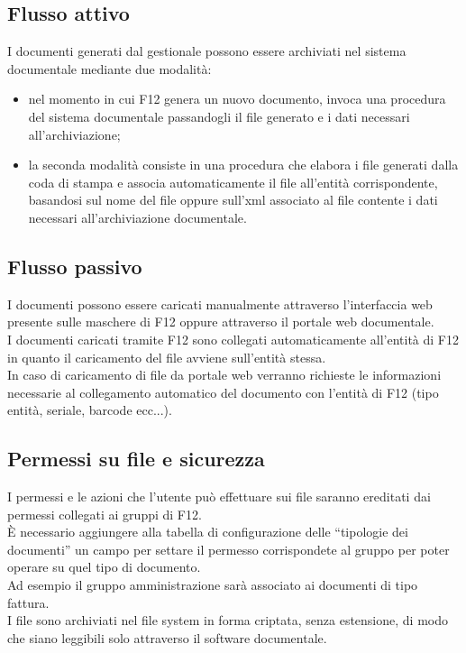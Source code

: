     \subsection{Flusso attivo}
    I documenti generati dal gestionale possono essere archiviati nel sistema documentale mediante due modalità:
    \begin{itemize}
        \item nel momento in cui F12 genera un nuovo documento, invoca una procedura del sistema documentale passandogli il file generato e i dati necessari all'archiviazione;
        
        \item la seconda modalità consiste in una procedura che elabora i file generati dalla coda di stampa e associa automaticamente il file all'entità corrispondente, basandosi sul nome del file oppure sull'xml associato al file contente i dati necessari all'archiviazione documentale.
    \end{itemize}
    
    \subsection{Flusso passivo}
    I documenti possono essere caricati manualmente attraverso l'interfaccia web presente sulle maschere di F12 oppure attraverso il portale web documentale.
    \\
    I documenti caricati tramite F12 sono collegati automaticamente all'entità di F12 in quanto il caricamento del file avviene sull'entità stessa.
    \\
    In caso di caricamento di file da portale web verranno richieste le informazioni necessarie al collegamento automatico del documento con l'entità di F12 (tipo entità, seriale, barcode ecc...).
    
    \subsection{Permessi su file e sicurezza}
    I permessi e le azioni che l'utente può effettuare sui file saranno ereditati dai permessi collegati ai gruppi di F12.
    \\
    È necessario aggiungere alla tabella di configurazione delle “tipologie dei documenti” un campo per settare il permesso corrispondete al gruppo per poter operare su quel tipo di documento.
    \\
    Ad esempio il gruppo amministrazione sarà associato ai documenti di tipo fattura.
    \\
    I file sono archiviati nel file system in forma criptata, senza estensione, di modo che siano leggibili solo attraverso il software documentale.


